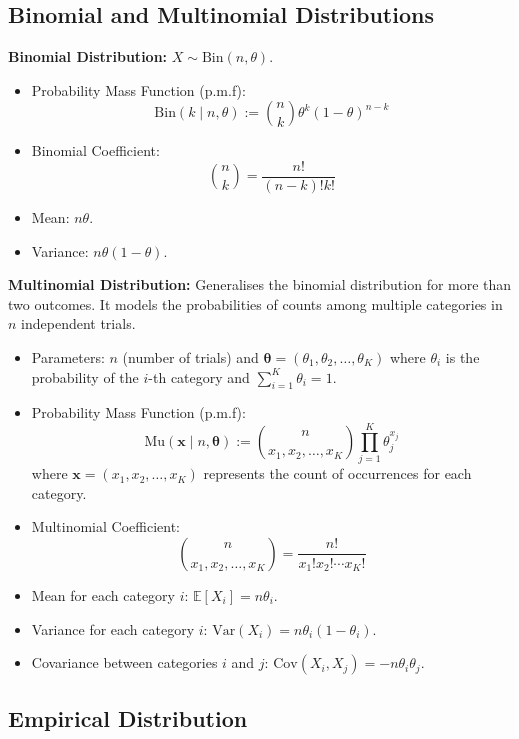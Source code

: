 \subsection{Binomial and Multinomial Distributions}
\textbf{Binomial Distribution:} \(X \sim \text{Bin}(n, \theta)\).
\begin{itemize}
    \item Probability Mass Function (p.m.f):
    \[
    \text{Bin}(k \mid n, \theta) := \binom{n}{k} \theta^k (1 - \theta)^{n-k}
    \]
    \item Binomial Coefficient:
    \[
    \binom{n}{k} = \frac{n!}{(n - k)!k!}
    \]
    \item Mean: \(n\theta\).
    \item Variance: \(n\theta(1 - \theta)\).
\end{itemize}

\textbf{Multinomial Distribution:} Generalises the binomial distribution for more than two outcomes. It models the probabilities of counts among multiple categories in \(n\) independent trials.
\begin{itemize}
    \item Parameters: \(n\) (number of trials) and \(\boldsymbol{\theta} = (\theta_1, \theta_2, \ldots, \theta_K)\) where \(\theta_i\) is the probability of the \(i\)-th category and \(\sum_{i=1}^{K} \theta_i = 1\).
    \item Probability Mass Function (p.m.f):
    \[
    \text{Mu}(\mathbf{x} \mid n, \boldsymbol{\theta}) := \binom{n}{x_1, x_2, \ldots, x_K} \prod_{j=1}^{K} \theta_j^{x_j}
    \]
    where \(\mathbf{x} = (x_1, x_2, \ldots, x_K)\) represents the count of occurrences for each category.
    \item Multinomial Coefficient:
    \[
    \binom{n}{x_1, x_2, \ldots, x_K} = \frac{n!}{x_1! x_2! \cdots x_K!}
    \]
    \item Mean for each category \(i\): \(\mathbb{E}[X_i] = n\theta_i\).
    \item Variance for each category \(i\): \(\text{Var}(X_i) = n\theta_i(1 - \theta_i)\).
    \item Covariance between categories \(i\) and \(j\): \(\text{Cov}(X_i, X_j) = -n\theta_i\theta_j\).
\end{itemize}


\subsection{Empirical Distribution}


